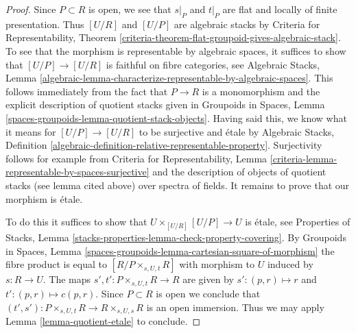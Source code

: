\documentclass[10pt,a4paper]{amsart}
\theoremstyle{plain}
\theoremstyle{definition}
\theoremstyle{remark}
\numberwithin{equation}{subsection}
\begin{document}
\begin{proof}
Since $P \subset R$ is open, we see that $s|_P$ and $t|_P$
are flat and locally of finite presentation.
Thus $[U/R]$ and $[U/P]$ are algebraic stacks by
Criteria for Representability, Theorem
\ref{criteria-theorem-flat-groupoid-gives-algebraic-stack}.
To see that the morphism is representable by algebraic spaces,
it suffices to show that $[U/P] \to [U/R]$ is faithful on
fibre categories, see
Algebraic Stacks, Lemma
\ref{algebraic-lemma-characterize-representable-by-algebraic-spaces}.
This follows immediately from the fact that $P \to R$ is a monomorphism
and the explicit description of quotient stacks given in
Groupoids in Spaces, Lemma
\ref{spaces-groupoids-lemma-quotient-stack-objects}.
Having said this, we know what it means for
$[U/P] \to [U/R]$ to be surjective and \'etale by
Algebraic Stacks, Definition
\ref{algebraic-definition-relative-representable-property}.
Surjectivity follows for example from
Criteria for Representability,
Lemma \ref{criteria-lemma-representable-by-spaces-surjective}
and the description of objects of quotient stacks
(see lemma cited above) over spectra of fields.
It remains to prove that our morphism is \'etale.

\medskip\noindent
To do this it suffices to show that $U \times_{[U/R]} [U/P] \to U$
is \'etale, see Properties of Stacks, Lemma
\ref{stacks-properties-lemma-check-property-covering}.
By Groupoids in Spaces, Lemma
\ref{spaces-groupoids-lemma-cartesian-square-of-morphism}
the fibre product is equal to $[R/P \times_{s, U, t} R]$
with morphism to $U$ induced by $s : R \to U$.
The maps $s', t' : P \times_{s, U, t} R \to R$ are given by
$s' : (p, r) \mapsto r$ and $t' : (p, r) \mapsto c(p, r)$. Since
$P \subset R$ is open we conclude that
$(t', s') : P \times_{s, U, t} R \to R \times_{s, U, s} R$
is an open immersion.
Thus we may apply Lemma \ref{lemma-quotient-etale}
to conclude.
\end{proof}
\end{document}
